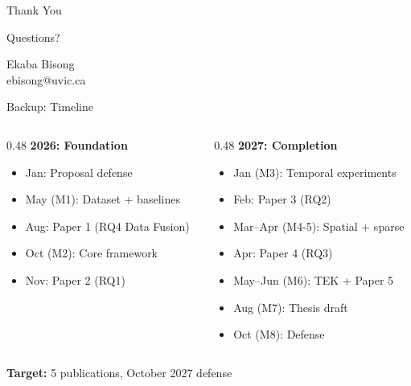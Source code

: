 \documentclass[10pt,xcolor={table,dvipsnames}]{beamer}
\begin{document}
\begin{frame}{}

\vspace{2em}
\centering
{\Huge Thank You}

\vspace{1.5em}
{\Large Questions?}

\vspace{2em}
\normalsize
Ekaba Bisong\\
ebisong@uvic.ca

\end{frame}


\begin{frame}{Backup: Timeline}

\begin{columns}[T]
\begin{column}{0.48\textwidth}
\textbf{2026: Foundation}
\begin{itemize}
  \item Jan: Proposal defense
  \item May (M1): Dataset + baselines
  \item Aug: Paper 1 (RQ4 Data Fusion)
  \item Oct (M2): Core framework
  \item Nov: Paper 2 (RQ1)
\end{itemize}
\end{column}

\begin{column}{0.48\textwidth}
\textbf{2027: Completion}
\begin{itemize}
  \item Jan (M3): Temporal experiments
  \item Feb: Paper 3 (RQ2)
  \item Mar--Apr (M4-5): Spatial + sparse
  \item Apr: Paper 4 (RQ3)
  \item May--Jun (M6): TEK + Paper 5
  \item Aug (M7): Thesis draft
  \item Oct (M8): Defense
\end{itemize}
\end{column}
\end{columns}

\vspace{0.5em}
\centering
\textbf{Target:} 5 publications, October 2027 defense

\end{frame}
\end{document}
